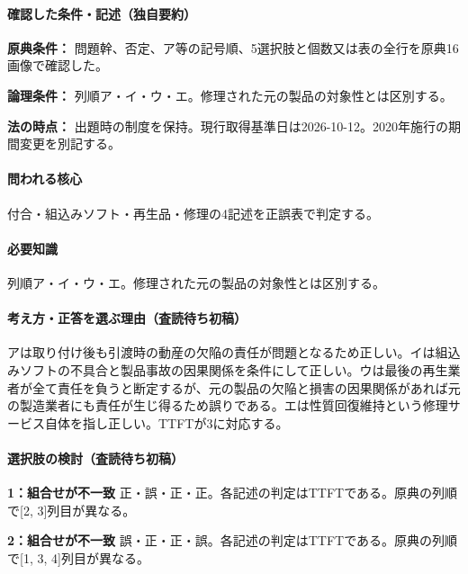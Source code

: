 \paragraph{確認した条件・記述（独自要約）}\mbox{}\par

\noindent\textbf{原典条件：} 問題幹、否定、ア等の記号順、5選択肢と個数又は表の全行を原典16画像で確認した。\par

\noindent\textbf{論理条件：} 列順ア・イ・ウ・エ。修理された元の製品の対象性とは区別する。\par

\noindent\textbf{法の時点：} 出題時の制度を保持。現行取得基準日は2026-10-12。2020年施行の期間変更を別記する。\par

\paragraph{問われる核心} 付合・組込みソフト・再生品・修理の4記述を正誤表で判定する。

\paragraph{必要知識} 列順ア・イ・ウ・エ。修理された元の製品の対象性とは区別する。

\paragraph{考え方・正答を選ぶ理由（査読待ち初稿）} アは取り付け後も引渡時の動産の欠陥の責任が問題となるため正しい。イは組込みソフトの不具合と製品事故の因果関係を条件にして正しい。ウは最後の再生業者が全て責任を負うと断定するが、元の製品の欠陥と損害の因果関係があれば元の製造業者にも責任が生じ得るため誤りである。エは性質回復維持という修理サービス自体を指し正しい。TTFTが3に対応する。

\paragraph{選択肢の検討（査読待ち初稿）}\mbox{}\par

\noindent\textbf{1：組合せが不一致} 正・誤・正・正。各記述の判定はTTFTである。原典の列順で[2, 3]列目が異なる。\par

\noindent\textbf{2：組合せが不一致} 誤・正・正・誤。各記述の判定はTTFTである。原典の列順で[1, 3, 4]列目が異なる。\par

